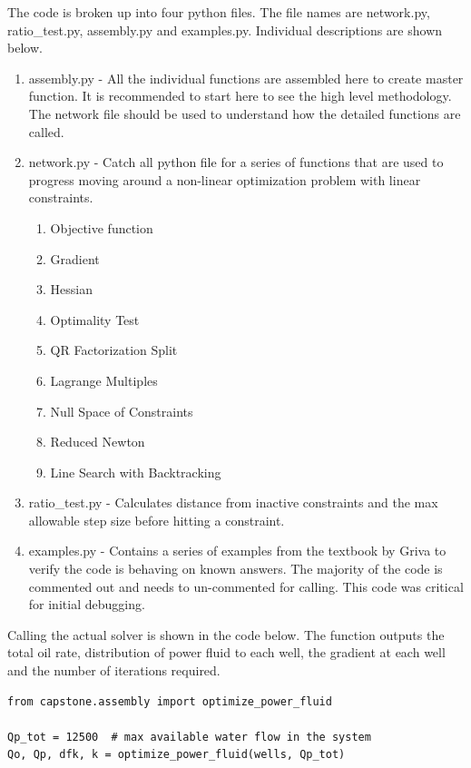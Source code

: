 \documentclass{article}
\begin{document}
The code is broken up into four python files. The file names are network.py, ratio\_test.py, assembly.py and examples.py. Individual descriptions are shown below.

\begin{enumerate}
    \item assembly.py - All the individual functions are assembled here to create master function. It is recommended to start here to see the high level methodology. The network file should be used to understand how the detailed functions are called.
    \item network.py - Catch all python file for a series of functions that are used to progress moving around a non-linear optimization problem with linear constraints.
    \begin{enumerate}
        \item Objective function
        \item Gradient
        \item Hessian
        \item Optimality Test
        \item QR Factorization Split
        \item Lagrange Multiples
        \item Null Space of Constraints
        \item Reduced Newton
        \item Line Search with Backtracking
    \end{enumerate}
    \item ratio\_test.py - Calculates distance from inactive constraints and the max allowable step size before hitting a constraint. 
    \item examples.py - Contains a series of examples from the textbook by Griva \cite{optm_griva} to verify the code is behaving on known answers. The majority of the code is commented out and needs to un-commented for calling. This code was critical for initial debugging.
\end{enumerate}

Calling the actual solver is shown in the code below. The function outputs the total oil rate, distribution of power fluid to each well, the gradient at each well and the number of iterations required.

\begin{verbatim}
from capstone.assembly import optimize_power_fluid

Qp_tot = 12500  # max available water flow in the system
Qo, Qp, dfk, k = optimize_power_fluid(wells, Qp_tot)
\end{verbatim}
\end{document}
